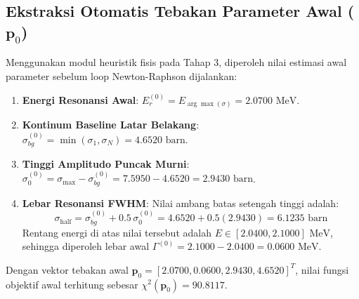 \subsection*{Ekstraksi Otomatis Tebakan Parameter Awal (\texorpdfstring{$\mathbf{p}_0$}{p0})}
Menggunakan modul heuristik fisis pada Tahap 3, diperoleh nilai estimasi awal parameter sebelum loop Newton-Raphson dijalankan:
\begin{enumerate}
    \item \textbf{Energi Resonansi Awal}: $E_r^{(0)} = E_{\arg\max(\sigma)} = 2.0700\text{ MeV}$.
    \item \textbf{Kontinum Baseline Latar Belakang}: $\sigma_{bg}^{(0)} = \min(\sigma_1, \sigma_N) = 4.6520\text{ barn}$.
    \item \textbf{Tinggi Amplitudo Puncak Murni}: $\sigma_0^{(0)} = \sigma_{\max} - \sigma_{bg}^{(0)} = 7.5950 - 4.6520 = 2.9430\text{ barn}$.
    \item \textbf{Lebar Resonansi FWHM}: Nilai ambang batas setengah tinggi adalah:
    \begin{equation}
        \sigma_{\text{half}} = \sigma_{bg}^{(0)} + 0.5\,\sigma_0^{(0)} = 4.6520 + 0.5(2.9430) = 6.1235\text{ barn}
    \end{equation}
    Rentang energi di atas nilai tersebut adalah $E \in [2.0400, 2.1000]\text{ MeV}$, sehingga diperoleh lebar awal $\Gamma^{(0)} = 2.1000 - 2.0400 = 0.0600\text{ MeV}$.
\end{enumerate}

Dengan vektor tebakan awal $\mathbf{p}_0 = [2.0700, 0.0600, 2.9430, 4.6520]^T$, nilai fungsi objektif awal terhitung sebesar $\chi^2(\mathbf{p}_0) = 90.8117$.
